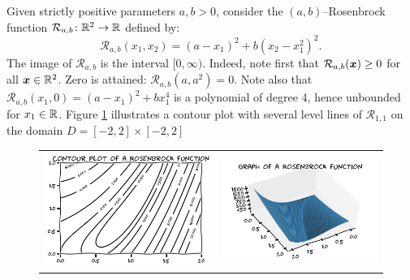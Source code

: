 \begin{example}\label{example:Rosenbrock2}
Given strictly positive parameters $a,b > 0$, consider the $(a,b)$--Rosenbrock function $\mathcal{R}_{a,b}\colon \mathbb{R}^2 \to \mathbb{R}$ defined by:
\begin{equation*} 
\mathcal{R}_{a,b}(x_1, x_2) = (a-x_1)^2 + b(x_2-x_1^2)^2.
\end{equation*}
The image of $\mathcal{R}_{a,b}$ is the interval $[0,\infty)$.  Indeed, note first that $\mathcal{R}_{a,b}(\boldsymbol{x}) \geq 0$ for all $\boldsymbol{x} \in \mathbb{R}^2$.  Zero is attained: $\mathcal{R}_{a,b} (a,a^2) = 0$.  Note also that $\mathcal{R}_{a,b}(x_1,0) = (a-x_1)^2 + bx_1^4$ is a polynomial of degree 4, hence unbounded for $x_1 \in \mathbb{R}$.
Figure \ref{figure:Rosenbrock} illustrates a contour plot with several level lines of $\mathcal{R}_{1,1}$ on the domain $D = [-2,2] \times [-2,2]$
\begin{figure}[ht!]\label{figure:Rosenbrock}
\begin{tabular}{cc}
\includegraphics[width=0.5\linewidth]{rosenbrockContour} &
\includegraphics[width=0.5\linewidth]{rosenbrockGraph}
\end{tabular}
\end{figure}
\end{example}



